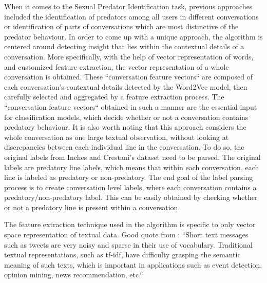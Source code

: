 \documentclass[11pt]{article}
\begin{document}
When it comes to the Sexual Predator Identification task, previous approaches included the identification of predators among all users in different conversations or identification of parts of conversations which are most distinctive of the predator behaviour. In order to come up with a unique approach, the algorithm is centered around detecting insight that lies within the contextual details of a conversation. More specifically, with the help of vector representation of words, and customized feature extraction, the vector representation of a whole conversation is obtained. These ``conversation feature vectors`` are composed of each conversation's contextual details detected by the Word2Vec model, then carefully selected and aggregated by a feature extraction process. The ``conversation feature vectors`` obtained in such a manner are the essential input for classification models, which decide whether or not a conversation contains predatory behaviour. It is also worth noting that this approach considers the whole conversation as one large textual observation, without looking at discrepancies between each individual line in the conversation. To do so, the original labels from Inches and Crestani's dataset need to be parsed. The original labels are predatory line labels, which means that within each conversation, each line is labeled as predatory or non-predatory. The end goal of the label parsing process is to create conversation level labels, where each conversation contains a predatory/non-predatory label. This can be easily obtained by checking whether or not a predatory line is present within a conversation.


The feature extraction technique used in the algorithm is specific to only vector space representation of textual data. Good quote from \cite{de2016representation}: ``Short text messages such as tweets are very noisy and sparse in their use of vocabulary. Traditional textual representations, such as tf-idf, have difficulty grasping the semantic meaning of such texts, which is important in applications such as event detection, opinion mining, news recommendation, etc.``

\end{document}
